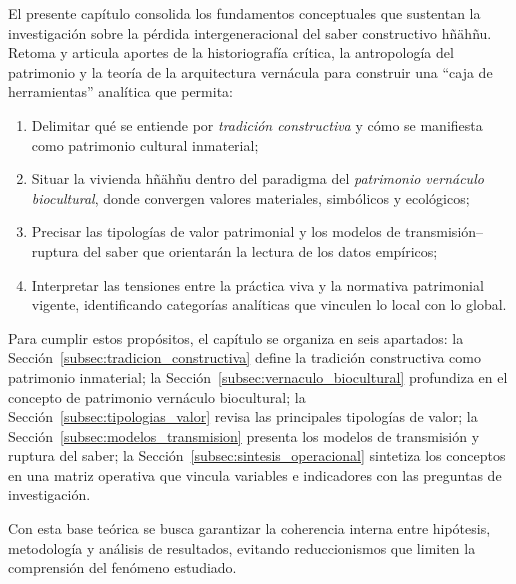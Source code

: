 El presente capítulo consolida los fundamentos conceptuales que
sustentan la investigación sobre la pérdida intergeneracional del saber
constructivo hñähñu.  Retoma y articula aportes de la historiografía
crítica, la antropología del patrimonio y la teoría de la arquitectura
vernácula para construir una ``caja de herramientas'' analítica que
permita:

\begin{enumerate}
	\item Delimitar qué se entiende por \emph{tradición constructiva} y
	      cómo se manifiesta como patrimonio cultural inmaterial;
	\item Situar la vivienda hñähñu dentro del paradigma del \emph{patrimonio
		      vernáculo biocultural}, donde convergen valores materiales,
	      simbólicos y ecológicos;
	\item Precisar las tipologías de valor patrimonial y los modelos de
	      transmisión–ruptura del saber que orientarán la lectura de los
	      datos empíricos;
	\item Interpretar las tensiones entre la práctica viva y la normativa
	      patrimonial vigente, identificando categorías analíticas que
	      vinculen lo local con lo global.
\end{enumerate}

Para cumplir estos propósitos, el capítulo se organiza en seis
apartados: la Sección~\ref{subsec:tradicion_constructiva} define la
tradición constructiva como patrimonio inmaterial; la
Sección~\ref{subsec:vernaculo_biocultural} profundiza en el concepto de
patrimonio vernáculo biocultural; la
Sección~\ref{subsec:tipologias_valor} revisa las principales tipologías
de valor; la Sección~\ref{subsec:modelos_transmision} presenta los
modelos de transmisión y ruptura del saber; la Sección~\ref{subsec:sintesis_operacional}
sintetiza los conceptos en una matriz operativa que vincula variables e indicadores
con las preguntas de investigación.

Con esta base teórica se busca garantizar la coherencia interna entre
hipótesis, metodología y análisis de resultados, evitando reduccionismos
que limiten la comprensión del fenómeno estudiado.
